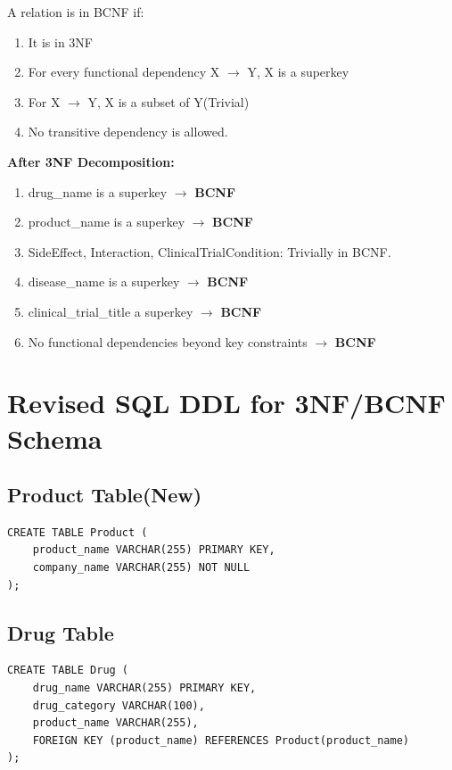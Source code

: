 \documentclass[12pt,a4paper]{article}
\begin{document}
A relation is in BCNF if:
\begin{enumerate}
    \item It is in 3NF
    \item For every functional dependency X $\rightarrow$ Y, X is a superkey
    \item For X $\rightarrow$ Y, X is a subset of Y(Trivial) 
    \item No transitive dependency is allowed.
\end{enumerate}


\textbf{After 3NF Decomposition:}
\begin{enumerate}
    \item drug\_name is a superkey $\rightarrow$ \textbf{BCNF}
    \item product\_name is a superkey $\rightarrow$ \textbf{BCNF}
    \item SideEffect, Interaction, ClinicalTrialCondition: Trivially in BCNF.
    \item disease\_name is a superkey $\rightarrow$ \textbf{BCNF}
    \item clinical\_trial\_title a superkey $\rightarrow$ \textbf{BCNF}
    \item No functional dependencies beyond key constraints $\rightarrow$ \textbf{BCNF}
\end{enumerate}

\section{Revised SQL DDL for 3NF/BCNF Schema}

\subsection{Product Table(New)}

\begin{lstlisting}[style=sqlstyle]
CREATE TABLE Product (
    product_name VARCHAR(255) PRIMARY KEY,
    company_name VARCHAR(255) NOT NULL
);
\end{lstlisting}

\subsection{Drug Table}

\begin{lstlisting}[style=sqlstyle]
CREATE TABLE Drug (
    drug_name VARCHAR(255) PRIMARY KEY,
    drug_category VARCHAR(100),
    product_name VARCHAR(255),
    FOREIGN KEY (product_name) REFERENCES Product(product_name)
);
\end{lstlisting}
\end{document}
